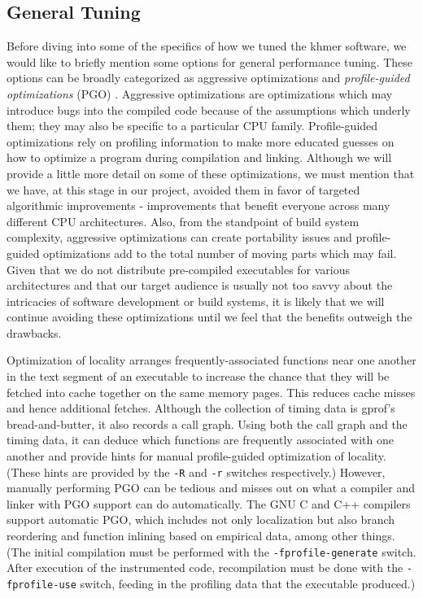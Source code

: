 \documentclass{article}
\begin{document}
\subsection{General Tuning}

Before diving into some of the specifics of how we tuned the khmer software, we
would like to briefly mention some options for general performance tuning.
These options can be broadly categorized as aggressive optimizations and
\textit{profile-guided optimizations} (PGO) \citep{web:PGO}. Aggressive
optimizations are optimizations which may introduce bugs into the compiled code
because of the assumptions which underly them; they may also be specific to a
particular CPU family. Profile-guided optimizations rely on profiling
information to make more educated guesses on how to optimize a program during
compilation and linking. Although we will provide a little more detail on some
of these optimizations, we must mention that we have, at this stage in our
project, avoided them in favor of targeted algorithmic improvements -
improvements that benefit everyone across many different CPU architectures.
Also, from the standpoint of build system complexity, aggressive optimizations
can create portability issues and profile-guided optimizations add to the total
number of moving parts which may fail. Given that we do not distribute
pre-compiled executables for various architectures and that our target audience
is usually not too savvy about the intricacies of software development or build
systems, it is likely that we will continue avoiding these optimizations until
we feel that the benefits outweigh the drawbacks.

Optimization of locality arranges frequently-associated functions near one
another in the text segment of an executable to increase the chance that they
will be fetched into cache together on the same memory pages. This reduces
cache misses and hence additional fetches. Although the collection of timing
data is gprof's bread-and-butter, it also records a call graph. Using both the
call graph and the timing data, it can deduce which functions are frequently
associated with one another and provide hints for manual profile-guided
optimization of locality. (These hints are provided by the \texttt{-R} and
\texttt{-r} switches respectively.) However, manually performing PGO can be
tedious and misses out on what a compiler and linker with PGO support can do
automatically. The GNU C and C++ compilers support automatic PGO, which
includes not only localization but also branch reordering and function inlining
based on empirical data, among other things. (The initial compilation must be
performed with the \texttt{-fprofile-generate} switch. After execution of the
instrumented code, recompilation must be done with the \texttt{-fprofile-use}
switch, feeding in the profiling data that the executable produced.)
\end{document}
